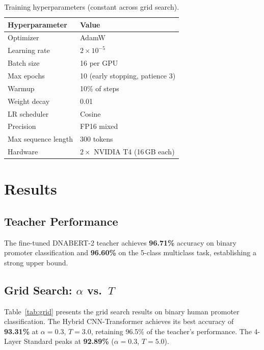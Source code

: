\documentclass{article}
\begin{document}
\begin{table}[t]
\centering
\caption{Training hyperparameters (constant across grid search).}
\label{tab:training}
\begin{tabular}{ll}
\toprule
\textbf{Hyperparameter} & \textbf{Value} \\
\midrule
Optimizer & AdamW \\
Learning rate & $2 \times 10^{-5}$ \\
Batch size & 16 per GPU \\
Max epochs & 10 (early stopping, patience 3) \\
Warmup & 10\% of steps \\
Weight decay & 0.01 \\
LR scheduler & Cosine \\
Precision & FP16 mixed \\
Max sequence length & 300 tokens \\
Hardware & $2\times$ NVIDIA T4 (16\,GB each) \\
\bottomrule
\end{tabular}
\end{table}

\section{Results}
\label{sec:results}

\subsection{Teacher Performance}

The fine-tuned DNABERT-2 teacher achieves \textbf{96.71\%} accuracy on binary promoter classification and \textbf{96.60\%} on the 5-class multiclass task, establishing a strong upper bound.

\subsection{Grid Search: $\alpha$ vs.\ $T$}

Table~\ref{tab:grid} presents the grid search results on binary human promoter classification. The Hybrid CNN-Transformer achieves its best accuracy of \textbf{93.31\%} at $\alpha\!=\!0.3$, $T\!=\!3.0$, retaining 96.5\% of the teacher's performance. The 4-Layer Standard peaks at \textbf{92.89\%} ($\alpha\!=\!0.3$, $T\!=\!5.0$).
\end{document}
